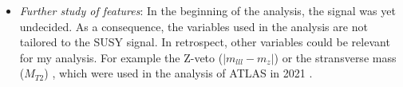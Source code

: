 \begin{itemize}
          given the goal of extending the limits, it would most likely be beneficial to prioritize the regions closest to the existing limits, in hopes of achieving a higher sensitivity in these 
          regions\footnote{See the final paragraph in section \ref{sec:PCA}}.  
    \item \emph{Further study of features}: In the beginning of the analysis, the signal was yet undecided. As a consequence, the variables used in the analysis are not tailored to the \ac{SUSY} 
          signal. In retrospect, other variables could be relevant for my analysis. For example the Z-veto ($|m_{lll}-m_z|$) or the stransverse mass ($M_{T2}$) \cite{lester_measuring_1999}, which were used in 
          the analysis of \ac{ATLAS} in 2021 \cite{atlas_search_2021}. 
\end{itemize}